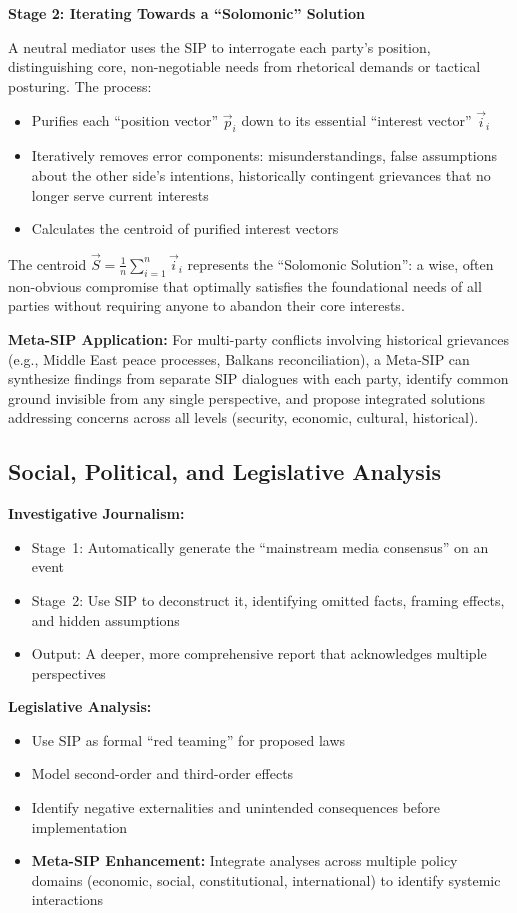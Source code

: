 \documentclass[11pt,a4paper]{article}
\begin{document}
\begin{small}
\textbf{Stage 2: Iterating Towards a ``Solomonic'' Solution}

A neutral mediator uses the SIP to interrogate each party's position, distinguishing core, non-negotiable needs from rhetorical demands or tactical posturing. The process:
\begin{itemize}[nosep]
    \item Purifies each ``position vector'' $\vec{p}_i$ down to its essential ``interest vector'' $\vec{i}_i$
    \item Iteratively removes error components: misunderstandings, false assumptions about the other side's intentions, historically contingent grievances that no longer serve current interests
    \item Calculates the centroid of purified interest vectors
\end{itemize}

The centroid $\vec{S} = \frac{1}{n}\sum_{i=1}^n \vec{i}_i$ represents the ``Solomonic Solution'': a wise, often non-obvious compromise that optimally satisfies the foundational needs of all parties without requiring anyone to abandon their core interests.

\textbf{Meta-SIP Application:} For multi-party conflicts involving historical grievances (e.g., Middle East peace processes, Balkans reconciliation), a Meta-SIP can synthesize findings from separate SIP dialogues with each party, identify common ground invisible from any single perspective, and propose integrated solutions addressing concerns across all levels (security, economic, cultural, historical).

\subsection{Social, Political, and Legislative Analysis}

\textbf{Investigative Journalism:}
\begin{itemize}[nosep]
    \item Stage~1: Automatically generate the ``mainstream media consensus'' on an event
    \item Stage~2: Use SIP to deconstruct it, identifying omitted facts, framing effects, and hidden assumptions
    \item Output: A deeper, more comprehensive report that acknowledges multiple perspectives
\end{itemize}

\textbf{Legislative Analysis:}
\begin{itemize}[nosep]
    \item Use SIP as formal ``red teaming'' for proposed laws
    \item Model second-order and third-order effects
    \item Identify negative externalities and unintended consequences before implementation
    \item \textbf{Meta-SIP Enhancement:} Integrate analyses across multiple policy domains (economic, social, constitutional, international) to identify systemic interactions
\end{itemize}


\end{small}
\end{document}

